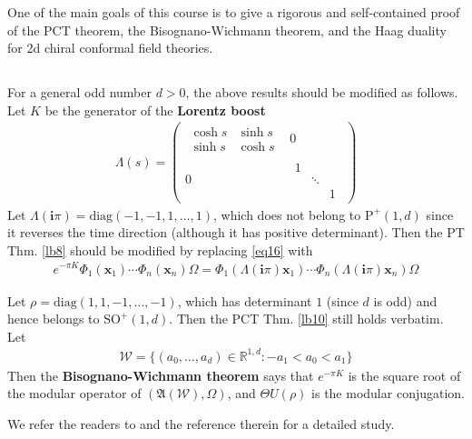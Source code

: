 \documentclass[12pt,b5paper,notitlepage]{article}
\theoremstyle{definition}
\theoremstyle{plain}
\newcommand{\fk}{\mathfrak}
\newcommand{\mc}{\mathcal}
\newcommand{\diag}{\mathrm{diag}}
\newcommand{\im}{\mathbf{i}}
\newcommand{\Rbb}{\mathbb R}
\newcommand{\Poid}{{\mathrm P}^+(1,d)}
\newcommand{\xbf}{\mathbf x}
\newcommand{\SO}{\mathrm{SO}}
\numberwithin{equation}{section}
\begin{document}
One of the main goals of this course is to give a rigorous and self-contained proof of the PCT theorem, the Bisognano-Wichmann theorem, and the Haag duality for 2d chiral conformal field theories.




\subsection{}

For a general odd number $d>0$, the above results should be modified as follows. Let $K$ be the generator of the \textbf{Lorentz boost} 
\begin{align*}
\Lambda(s)=\left(
\begin{array}{c|c}
\begin{matrix}
\cosh s&\sinh s\\
\sinh s&\cosh s
\end{matrix}
&0\\
\hline
0&
\begin{matrix}
1&&\\
&\ddots&\\
&&1
\end{matrix}
\end{array}
\right)
\end{align*}
Let $\Lambda(\im\pi)=\diag(-1,-1,1,\dots,1)$, which does not belong to $\Poid$ since it reverses the time direction (although it has positive determinant). Then the PT Thm. \ref{lb8} should be modified by replacing \eqref{eq16} with 
\begin{align}
e^{-\pi K}\Phi_1(\xbf_1)\cdots\Phi_n(\xbf_n)\Omega=\Phi_1(\Lambda(\im\pi)\xbf_1)\cdots\Phi_n(\Lambda(\im\pi)\xbf_n)\Omega
\end{align} 

Let $\rho=\diag(1,1,-1,\dots,-1)$, which has determinant $1$ (since $d$ is odd) and hence belongs to $\SO^+(1,d)$. Then the PCT Thm. \ref{lb10} still holds verbatim. Let
\begin{align}
\mc W=\{(a_0,\dots,a_d)\in\Rbb^{1,d}:-a_1<a_0<a_1\}
\end{align}
Then the \textbf{Bisognano-Wichmann theorem} says that $e^{-\pi K}$ is the square root of the modular operator of $(\fk A(\mc W),\Omega)$, and $\Theta U(\rho)$ is the modular conjugation. 


We refer the readers to \cite[Sec. V.4.1]{Haag} and the reference therein for a detailed study.
 


\newpage
\end{document}
